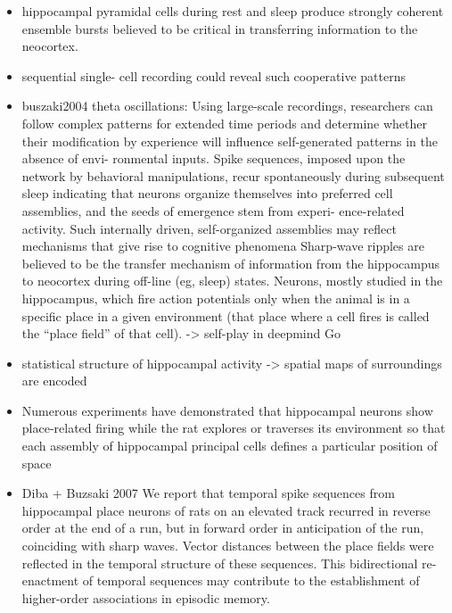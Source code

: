 \documentclass{article} %
\begin{document}
\begin{itemize}
\begin{itemize}
\item
hippocampal pyramidal cells during rest and sleep produce strongly coherent ensemble bursts believed to be critical in transferring information to the neocortex.

\item
sequential single- cell recording could reveal such cooperative patterns

\item
buszaki2004 theta oscillations:
Using large-scale recordings, researchers can follow complex patterns for extended time periods and determine whether their modification by experience will influence self-generated patterns in the absence of envi- ronmental inputs. Spike sequences, imposed upon the network by behavioral manipulations, recur spontaneously during subsequent sleep
indicating that neurons organize themselves into preferred cell assemblies, and the seeds of emergence stem from experi- ence-related activity.
 Such internally driven, self-organized assemblies may reflect mechanisms that give rise to cognitive phenomena
 Sharp-wave ripples are believed to be the transfer mechanism of information from the hippocampus to neocortex during off-line (eg, sleep) states.
Neurons, mostly studied in the hippocampus, which fire action potentials only when the animal is in a specific place in a given environment (that place where a cell fires is called the “place field” of that cell).
-> self-play in deepmind Go

\item
statistical structure of hippocampal activity ->
spatial maps of surroundings are encoded

\item
Numerous experiments have demonstrated that hippocampal neurons show place-related firing while the rat explores or traverses its environment so that each assembly of hippocampal principal cells defines a particular position of space 

\item
Diba + Buzsaki 2007
We report that temporal spike sequences from hippocampal place neurons of rats on an elevated track recurred in reverse order at the end of a run, but in forward order in anticipation of the run, coinciding with sharp waves. Vector distances between the place fields were reflected in the temporal structure of these sequences. This bidirectional re-enactment of temporal sequences may contribute to the establishment of higher-order associations in episodic memory.


\end{itemize}
\end{itemize}
\end{document}
